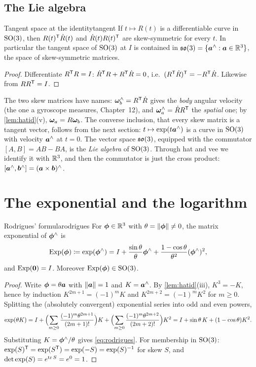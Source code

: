 \subsection{The Lie algebra}

\begin{proposition}{Tangent space at the identity}{tangent}
If $t\mapsto R(t)$ is a differentiable curve in $\mathrm{SO}(3)$, then
$R(t)^{\mathsf{T}}\dot R(t)$ and $\dot R(t)R(t)^{\mathsf{T}}$ are skew-symmetric for every $t$.
In particular the tangent space of $\mathrm{SO}(3)$ at $I$ is contained in
$\mathfrak{so}(3)=\{\bm{a}^{\wedge}:\bm{a}\in\mathbb{R}^3\}$, the space of
skew-symmetric matrices.
\end{proposition}

\begin{proof}
Differentiate $R^{\mathsf{T}} R=I$: $\dot R^{\mathsf{T}} R+R^{\mathsf{T}}\dot R=0$, i.e.\
$(R^{\mathsf{T}}\dot R)^{\mathsf{T}}=-R^{\mathsf{T}}\dot R$. Likewise from $RR^{\mathsf{T}}=I$.
\end{proof}

The two skew matrices have names: $\bm{\omega}_b^{\wedge}=R^{\mathsf{T}}\dot R$ gives the
\emph{body} angular velocity (the one a gyroscope measures, Chapter~12),
and $\bm{\omega}_a^{\wedge}=\dot RR^{\mathsf{T}}$ the \emph{spatial} one; by
\cref{lem:hatid}(v), $\bm{\omega}_a=R\bm{\omega}_b$. The converse inclusion,
that every skew matrix is a tangent vector, follows from the next
section: $t\mapsto\exp(t\bm{a}^{\wedge})$ is a curve in $\mathrm{SO}(3)$ with
velocity $\bm{a}^{\wedge}$ at $t=0$. The vector space $\mathfrak{so}(3)$, equipped
with the commutator $[A,B]=AB-BA$, is the \emph{Lie algebra} of $\mathrm{SO}(3)$.
Through hat and vee we identify it with $\mathbb{R}^3$, and then the
commutator is just the cross product:
$[\bm{a}^{\wedge},\bm{b}^{\wedge}]=(\bm{a}\times\bm{b})^{\wedge}$.

\section{The exponential and the logarithm}

\begin{theorem}{Rodrigues' formula}{rodrigues}
For $\bm{\phi}\in\mathbb{R}^3$ with $\theta=\left\lVert \bm{\phi}\right\rVert\neq0$, the matrix
exponential of $\bm{\phi}^{\wedge}$ is
\begin{equation}\label{eq:rodrigues}
\operatorname{Exp}(\bm{\phi})\coloneqq\exp(\bm{\phi}^{\wedge})
=I+\frac{\sin\theta}{\theta}\bm{\phi}^{\wedge}
 +\frac{1-\cos\theta}{\theta^2}(\bm{\phi}^{\wedge})^2,
\end{equation}
and $\operatorname{Exp}(\bm{0})=I$. Moreover $\operatorname{Exp}(\bm{\phi})\in\mathrm{SO}(3)$.
\end{theorem}

\begin{proof}
Write $\bm{\phi}=\theta\bm{a}$ with $\left\lVert \bm{a}\right\rVert=1$ and $K=
\bm{a}^{\wedge}$. By \cref{lem:hatid}(iii), $K^3=-K$, hence by induction
$K^{2m+1}=(-1)^mK$ and $K^{2m+2}=(-1)^mK^2$ for $m\ge0$. Splitting the
(absolutely convergent) exponential series into odd and even powers,
\[
\exp(\theta K)=I+\Bigl(\sum_{m\ge0}\frac{(-1)^m\theta^{2m+1}}{(2m+1)!}
\Bigr)K+\Bigl(\sum_{m\ge0}\frac{(-1)^m\theta^{2m+2}}{(2m+2)!}\Bigr)K^2
=I+\sin\theta\,K+(1-\cos\theta)K^2 .
\]
Substituting $K=\bm{\phi}^{\wedge}/\theta$ gives \eqref{eq:rodrigues}. For
membership in $\mathrm{SO}(3)$: $\exp(S)^{\mathsf{T}}=\exp(S^{\mathsf{T}})=\exp(-S)=\exp(S)^{-1}$ for
skew $S$, and $\det\exp(S)=e^{\operatorname{tr} S}=e^0=1$.
\end{proof}

